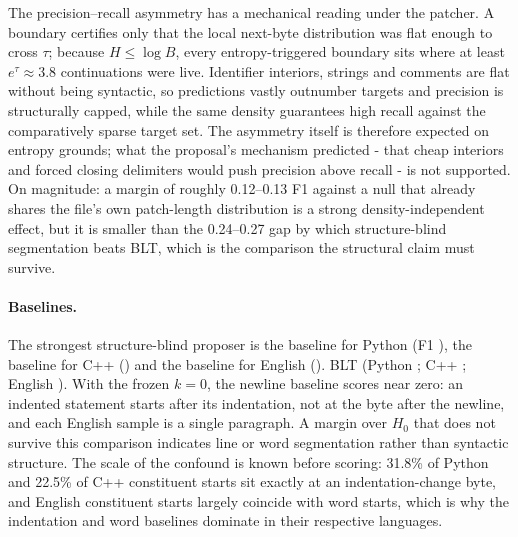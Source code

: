 The precision--recall asymmetry has a mechanical reading under the patcher. A boundary certifies only that the local next-byte distribution was flat enough to cross $\tau$; because $H\le\log B$, every entropy-triggered boundary sits where at least $e^{\tau}\approx3.8$ continuations were live. Identifier interiors, strings and comments are flat without being syntactic, so predictions vastly outnumber targets and precision is structurally capped, while the same density guarantees high recall against the comparatively sparse target set. The asymmetry itself is therefore expected on entropy grounds; what the proposal's mechanism predicted - that cheap interiors and forced closing delimiters would push precision above recall - is not supported. On magnitude: a margin of roughly 0.12--0.13 F1 against a null that already shares the file's own patch-length distribution is a strong density-independent effect, but it is smaller than the 0.24--0.27 gap by which structure-blind segmentation beats BLT, which is the comparison the structural claim must survive.

\TableBaselines
\paragraph{Baselines.} The strongest structure-blind proposer is the \StrongestPy{} baseline for Python (F1 \StrongestFonePy{}), the \StrongestCpp{} baseline for C++ (\StrongestFoneCpp{}) and the \StrongestEn{} baseline for English (\StrongestFoneEn{}). BLT \RTwoAll{} (Python \VsBasePy{} \VsBaseCIPy{}; C++ \VsBaseCpp{} \VsBaseCICpp{}; English \VsBaseEn{} \VsBaseCIEn{}). With the frozen $k=0$, the newline baseline scores near zero: an indented statement starts after its indentation, not at the byte after the newline, and each English sample is a single paragraph. A margin over $H_0$ that does not survive this comparison indicates line or word segmentation rather than syntactic structure. The scale of the confound is known before scoring: 31.8\% of Python and 22.5\% of C++ constituent starts sit exactly at an indentation-change byte, and English constituent starts largely coincide with word starts, which is why the indentation and word baselines dominate in their respective languages.

